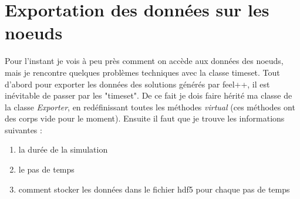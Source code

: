\documentclass[12pt]{article}
\begin{document}
\section {Exportation des données sur les noeuds}
Pour l'instant je vois à peu près comment on accède aux données des noeuds, mais je rencontre quelques problèmes techniques avec la classe timeset. Tout d'abord pour exporter les données des solutions générés par feel++, il est inévitable de passer par les "timeset". De ce fait je dois faire hérité ma classe de la classe \emph{Exporter}, en redéfinissant toutes les méthodes \emph{virtual} (ces méthodes ont des corps vide pour le moment). Ensuite il faut que je trouve les informations suivantes :
\begin{enumerate} 
\item la durée de la simulation
\item le pas de temps
\item comment stocker les données dans le fichier hdf5 pour chaque pas de temps 
\end{enumerate}
\end{document}
